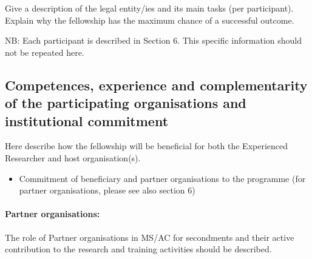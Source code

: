 Give a description of the legal entity/ies and its main tasks (per participant).
Explain why the fellowship has the maximum chance of a successful outcome.

NB: Each participant is described in Section 6. This specific information should not be repeated here.

\subsection{Competences, experience and complementarity of the participating organisations and institutional commitment}
\label{sec:competences}

Here describe how the fellowship will be beneficial for both the Experienced Researcher and host organisation(s).
\begin{itemize}
\item Commitment of beneficiary and partner organisations to the programme (for partner organisations, please see also section 6)
\end{itemize}

\paragraph{Partner organisations:}
The role of Partner organisations in MS/AC for secondments and their active contribution to the research and training activities should be described.
